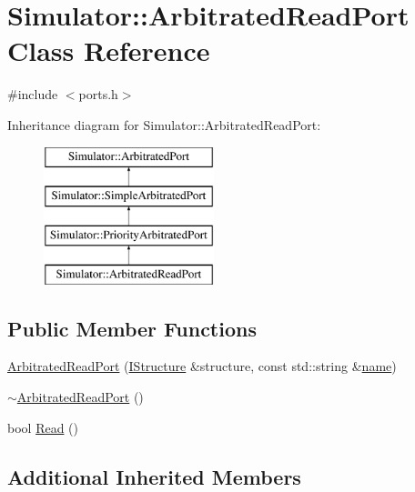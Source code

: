 \hypertarget{class_simulator_1_1_arbitrated_read_port}{\section{Simulator\+:\+:Arbitrated\+Read\+Port Class Reference}
\label{class_simulator_1_1_arbitrated_read_port}
}


{\ttfamily \#include $<$ports.\+h$>$}

Inheritance diagram for Simulator\+:\+:Arbitrated\+Read\+Port\+:\begin{figure}[H]
\begin{center}
\leavevmode
\includegraphics[height=4.000000cm]{class_simulator_1_1_arbitrated_read_port}
\end{center}
\end{figure}
\subsection*{Public Member Functions}
\begin{DoxyCompactItemize}
\item 
\hyperlink{class_simulator_1_1_arbitrated_read_port_ac49567e95fc06438cff7c3354934741e}{Arbitrated\+Read\+Port} (\hyperlink{class_simulator_1_1_i_structure}{I\+Structure} \&structure, const std\+::string \&\hyperlink{mtconf_8c_a8f8f80d37794cde9472343e4487ba3eb}{name})
\item 
\hyperlink{class_simulator_1_1_arbitrated_read_port_abd33f33ee81cc86326dc1ee32bb65021}{$\sim$\+Arbitrated\+Read\+Port} ()
\item 
bool \hyperlink{class_simulator_1_1_arbitrated_read_port_a5a0a12344479df158af1b91b93976fc2}{Read} ()
\end{DoxyCompactItemize}
\subsection*{Additional Inherited Members}


